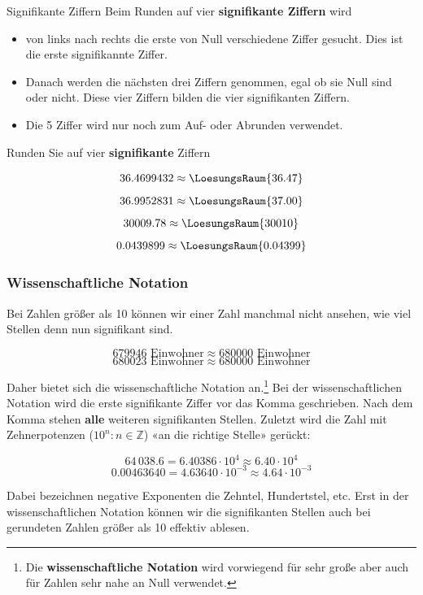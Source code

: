 \begin{rezept}{Signifikante Ziffern}{}
  Beim Runden auf vier \textbf{signifikante Ziffern} wird
  \begin{itemize}
  \item  von links nach rechts die erste von Null verschiedene Ziffer gesucht. Dies ist die
    erste signifikannte Ziffer.
  \item
    Danach werden die nächsten drei Ziffern
  genommen, egal ob sie Null sind oder nicht. Diese vier Ziffern
  bilden die vier signifikanten Ziffern. 
\item
  Die 5 Ziffer wird nur noch
  zum Auf- oder Abrunden verwendet.
  \end{itemize}
\end{rezept}

Runden Sie auf vier \textbf{signifikante} Ziffern

$$36.4699432 \approx \LoesungsRaum{36.47}$$
$$36.9952831 \approx \LoesungsRaum{37.00}$$
$$30009.78   \approx \LoesungsRaum{30010}$$
$$0.0439899  \approx \LoesungsRaum{0.04399}$$
\newpage

  
\subsubsection{Wissenschaftliche Notation}\label{wissenschaftlicheNotation}
Bei Zahlen größer als 10 können wir einer Zahl manchmal nicht ansehen, wie viel Stellen denn nun signifikant sind.

$$ 679946 \textrm{\ Einwohner} \approx  680000 \textrm{\ Einwohner}$$
$$ 680023 \textrm{\ Einwohner} \approx  680000 \textrm{\ Einwohner}$$

Daher bietet sich die wissenschaftliche Notation an.\footnote{Die
\textbf{wissenschaftliche Notation} wird vorwiegend für sehr große
aber auch für Zahlen sehr nahe an Null verwendet.}
Bei der wissenschaftlichen Notation wird die erste signifikante Ziffer
vor das Komma geschrieben. Nach dem Komma stehen \textbf{alle} weiteren signifikanten Stellen.
Zuletzt wird die Zahl mit Zehnerpotenzen
($10^{n}: n \in \mathbb{Z}$) «an die richtige Stelle» gerückt:

$$64\,038.6  = 6.40386 \cdot 10^{ 4}\approx 6.40 \cdot 10^{ 4}$$
$$0.00463640 = 4.63640 \cdot 10^{-3}\approx 4.64 \cdot 10^{-3}$$

Dabei bezeichnen negative Exponenten die Zehntel, Hundertstel, etc.
Erst in der wissenschaftlichen Notation können wir die signifikanten Stellen auch bei gerundeten Zahlen größer als 10 effektiv ablesen.

